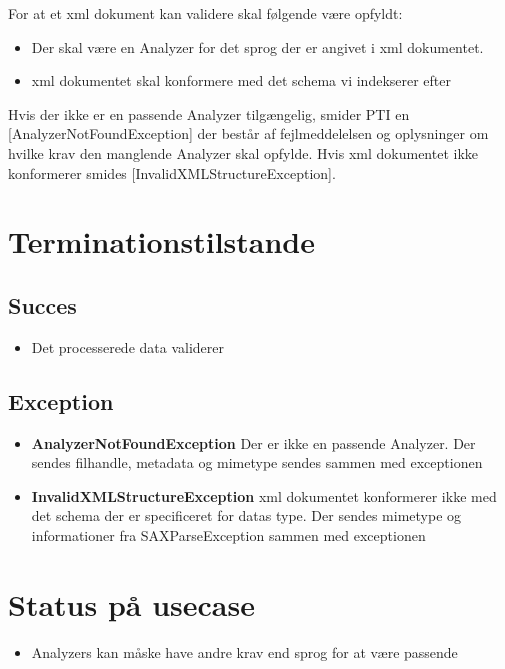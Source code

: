 \documentclass{article}
\begin{document}
For at et xml dokument kan validere skal følgende være opfyldt:
\begin{itemize}
\item Der skal være en Analyzer for det sprog der er angivet i xml dokumentet.
\item xml dokumentet skal konformere med det schema vi indekserer efter
\end{itemize}

Hvis der ikke er en passende Analyzer tilgængelig, smider
PTI en [AnalyzerNotFoundException] der består af fejlmeddelelsen og
oplysninger om hvilke krav den manglende Analyzer skal opfylde. 
Hvis xml dokumentet ikke konformerer smides [InvalidXMLStructureException]. 

\section{Terminationstilstande}

\subsection{Succes}

\begin{itemize}
\item Det processerede data validerer
\end{itemize}

\subsection{Exception}

\begin{itemize}
\item \textbf{AnalyzerNotFoundException} Der er ikke en passende
  Analyzer. Der sendes filhandle, metadata og mimetype sendes sammen
  med exceptionen
\item \textbf{InvalidXMLStructureException} xml dokumentet konformerer
  ikke med det schema der er specificeret for datas type. Der sendes
  mimetype og informationer fra SAXParseException sammen med exceptionen
\end{itemize}

\section{Status på usecase}

\begin{itemize}
\item Analyzers kan måske have andre krav end sprog for at være
  passende 
\end{itemize}
\end{document}
